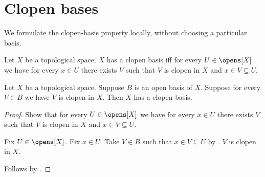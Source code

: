 \section{Clopen bases}



We formulate the clopen-basis property locally, without choosing a particular
basis.

\begin{definition}\label{has_clopen_basis}
    Let $X$ be a topological space.
    $X$ has a clopen basis iff
        for every $U\in\opens[X]$ we have for every $x\in U$
        there exists $V$ such that
            $V$ is clopen in $X$ and $x\in V\subseteq U$.
\end{definition}

\begin{theorem}\label{clopen_open_basis_implies_has_clopen_basis}
    Let $X$ be a topological space.
    Suppose $B$ is an open basis of $X$.
    Suppose for every $V\in B$ we have $V$ is clopen in $X$.
    Then $X$ has a clopen basis.
\end{theorem}
\begin{proof}
    Show that for every $U\in\opens[X]$ we have for every $x\in U$
        there exists $V$ such that
            $V$ is clopen in $X$ and $x\in V\subseteq U$.
    \begin{subproof}
        Fix $U\in\opens[X]$.
        Fix $x\in U$.
        Take $V\in B$ such that $x\in V\subseteq U$
            by .
        $V$ is clopen in $X$.
    \end{subproof}
    Follows by .
\end{proof}
